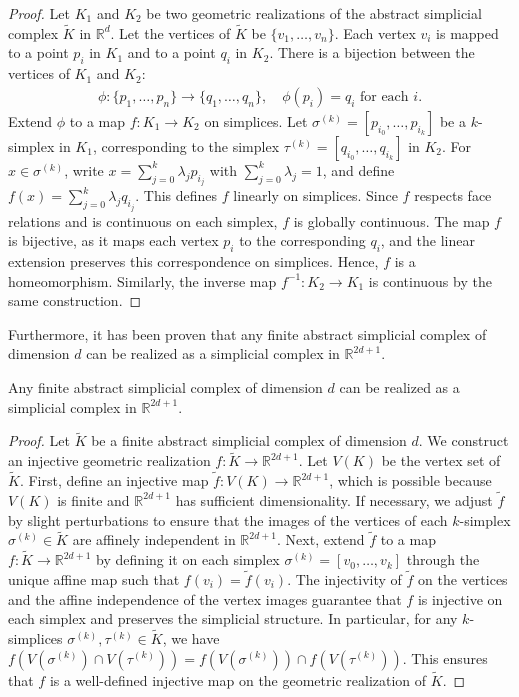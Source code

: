 \begin{proof}
Let $K_1$ and $K_2$ be two geometric realizations of the abstract simplicial complex $\tilde{K}$ in $\mathbb{R}^d$. Let the vertices of $\tilde{K}$ be $\{v_1, \dots, v_n\}$. Each vertex $v_i$ is mapped to a point $p_i$ in $K_1$ and to a point $q_i$ in $K_2$. There is a bijection between the vertices of $K_1$ and $K_2$: 
\begin{align}
\phi: \{p_1, \dots, p_n\} \to \{q_1, \dots, q_n\}, \quad \phi(p_i) = q_i \text{ for each } i.
\end{align}
Extend $\phi$ to a map $f: K_1 \to K_2$ on simplices. Let $\sigma^{(k)} = [p_{i_0}, \dots, p_{i_{k}}]$ be a $k$-simplex in $K_1$, corresponding to the simplex $\tau^{(k)} = [q_{i_0}, \dots, q_{i_{k}}]$ in $K_2$. For $x \in \sigma^{(k)}$, write $x = \sum_{j=0}^{k} \lambda_j p_{i_j}$ with $\sum_{j=0}^{k} \lambda_j = 1$, and define $f(x) = \sum_{j=0}^{k} \lambda_j q_{i_j}$. This defines $f$ linearly on simplices. Since $f$ respects face relations and is continuous on each simplex, $f$ is globally continuous. The map $f$ is bijective, as it maps each vertex $p_i$ to the corresponding $q_i$, and the linear extension preserves this correspondence on simplices. Hence, $f$ is a homeomorphism. Similarly, the inverse map $f^{-1}: K_2 \to K_1$ is continuous by the same construction.
\end{proof}

Furthermore, it has been proven that any finite abstract simplicial complex of dimension
$d$ can be realized as a simplicial complex in $\mathbb{R}^{2d+1}$.

\begin{theorem}
Any finite abstract simplicial complex of dimension $d$ can be realized as a simplicial complex in $\mathbb{R}^{2d+1}$.
\end{theorem}

\begin{proof}
Let $\tilde{K}$ be a finite abstract simplicial complex of dimension $d$. We construct an injective geometric realization $f: \tilde{K} \to \mathbb{R}^{2d+1}$.  Let $V(K)$ be the vertex set of $\tilde{K}$. First, define an injective map $\tilde{f}: V(K) \to \mathbb{R}^{2d+1}$, which is possible because $V(K)$ is finite and $\mathbb{R}^{2d+1}$ has sufficient dimensionality. If necessary, we adjust $\tilde{f}$ by slight perturbations to ensure that the images of the vertices of each $k$-simplex $\sigma^{(k)} \in \tilde{K}$ are affinely independent in $\mathbb{R}^{2d+1}$. Next, extend $\tilde{f}$ to a map $f: \tilde{K} \to \mathbb{R}^{2d+1}$ by defining it on each simplex $\sigma^{(k)} = [v_0, \dots, v_k]$ through the unique affine map such that $f(v_i) = \tilde{f}(v_i)$. The injectivity of $\tilde{f}$ on the vertices and the affine independence of the vertex images guarantee that $f$ is injective on each simplex and preserves the simplicial structure. In particular, for any $k$-simplices $\sigma^{(k)}, \tau^{(k)} \in \tilde{K}$, we have $f(V(\sigma^{(k)}) \cap V(\tau^{(k)})) = f(V(\sigma^{(k)})) \cap f(V(\tau^{(k)}))$. This ensures that $f$ is a well-defined injective map on the geometric realization of $\tilde{K}$.
\end{proof}

